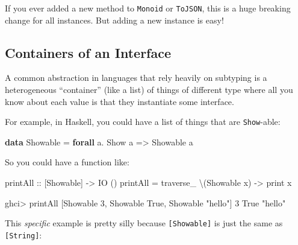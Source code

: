 \documentclass[]{article}
\newenvironment{Shaded}{}{}
\newcommand{\DataTypeTok}[1]{\textcolor[rgb]{0.56,0.13,0.00}{#1}}
\newcommand{\DecValTok}[1]{\textcolor[rgb]{0.25,0.63,0.44}{#1}}
\newcommand{\FunctionTok}[1]{\textcolor[rgb]{0.02,0.16,0.49}{#1}}
\newcommand{\KeywordTok}[1]{\textcolor[rgb]{0.00,0.44,0.13}{\textbf{#1}}}
\newcommand{\NormalTok}[1]{#1}
\newcommand{\OperatorTok}[1]{\textcolor[rgb]{0.40,0.40,0.40}{#1}}
\newcommand{\OtherTok}[1]{\textcolor[rgb]{0.00,0.44,0.13}{#1}}
\newcommand{\StringTok}[1]{\textcolor[rgb]{0.25,0.44,0.63}{#1}}
\begin{document}
If you ever added a new method to \texttt{Monoid} or \texttt{ToJSON}, this is a
huge breaking change for all instances. But adding a new instance is easy!

\subsection{Containers of an Interface}\label{containers-of-an-interface}

A common abstraction in languages that rely heavily on subtyping is a
heterogeneous ``container'' (like a list) of things of different type where all
you know about each value is that they instantiate some interface.

For example, in Haskell, you could have a list of things that are
\texttt{Show}-able:

\begin{Shaded}
\begin{Highlighting}[]
\KeywordTok{data} \DataTypeTok{Showable} \OtherTok{=} \KeywordTok{forall}\NormalTok{ a}\OperatorTok{.} \DataTypeTok{Show}\NormalTok{ a }\OtherTok{=\textgreater{}} \DataTypeTok{Showable}\NormalTok{ a}
\end{Highlighting}
\end{Shaded}

So you could have a function like:

\begin{Shaded}
\begin{Highlighting}[]
\OtherTok{printAll ::}\NormalTok{ [}\DataTypeTok{Showable}\NormalTok{] }\OtherTok{{-}\textgreater{}} \DataTypeTok{IO}\NormalTok{ ()}
\NormalTok{printAll }\OtherTok{=}\NormalTok{ traverse\_ \textbackslash{}(}\DataTypeTok{Showable}\NormalTok{ x) }\OtherTok{{-}\textgreater{}} \FunctionTok{print}\NormalTok{ x}
\end{Highlighting}
\end{Shaded}

\begin{Shaded}
\begin{Highlighting}[]
\NormalTok{ghci}\OperatorTok{\textgreater{}}\NormalTok{ printAll [}\DataTypeTok{Showable} \DecValTok{3}\NormalTok{, }\DataTypeTok{Showable} \DataTypeTok{True}\NormalTok{, }\DataTypeTok{Showable} \StringTok{"hello"}\NormalTok{]}
\DecValTok{3}
\DataTypeTok{True}
\StringTok{"hello"}
\end{Highlighting}
\end{Shaded}

This \emph{specific} example is pretty silly because \texttt{{[}Showable{]}} is
just the same as \texttt{{[}String{]}}:
\end{document}
